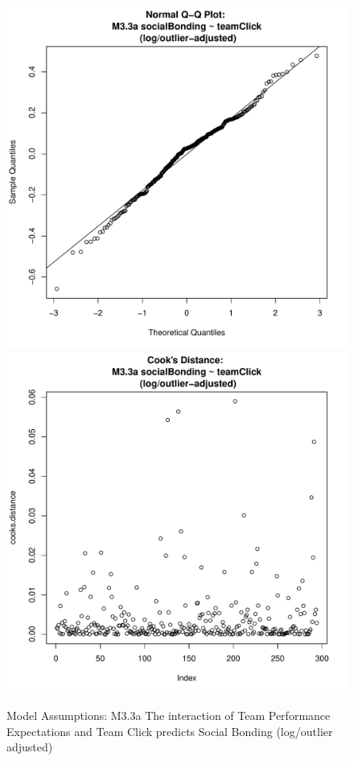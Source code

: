 \documentclass[12pt]{report}
\begin{document}
{\begin{figure}[htbp]
  \includegraphics[scale =0.4]{../images/MLM33aOutLogQQNorm.pdf}
  \includegraphics[scale =0.4]{../images/MLM33aOutLogCooksD.pdf}
  \caption{Model Assumptions: M3.3a The interaction of Team Performance Expectations and Team Click predicts Social Bonding (log/outlier adjusted)}
  \label{fig:MLM33aOutLogAssumptions}
\end{figure}





}
\end{document}
